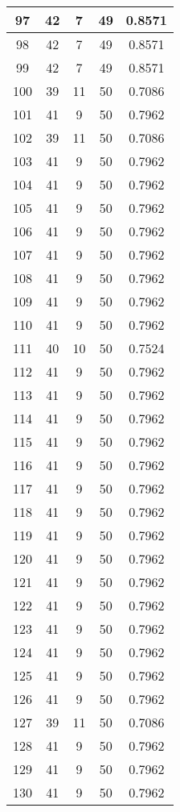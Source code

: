 \documentclass[letterpaper, 12pt]{article}
\begin{document}
\begin{longtable}{|c|c|c|c|c|}
\hline
97 & 42 & 7 & 49 & 0.8571 \\
\hline
98 & 42 & 7 & 49 & 0.8571 \\
\hline
99 & 42 & 7 & 49 & 0.8571 \\
\hline
100 & 39 & 11 & 50 & 0.7086 \\
\hline
101 & 41 & 9 & 50 & 0.7962 \\
\hline
102 & 39 & 11 & 50 & 0.7086 \\
\hline
103 & 41 & 9 & 50 & 0.7962 \\
\hline
104 & 41 & 9 & 50 & 0.7962 \\
\hline
105 & 41 & 9 & 50 & 0.7962 \\
\hline
106 & 41 & 9 & 50 & 0.7962 \\
\hline
107 & 41 & 9 & 50 & 0.7962 \\
\hline
108 & 41 & 9 & 50 & 0.7962 \\
\hline
109 & 41 & 9 & 50 & 0.7962 \\
\hline
110 & 41 & 9 & 50 & 0.7962 \\
\hline
111 & 40 & 10 & 50 & 0.7524 \\
\hline
112 & 41 & 9 & 50 & 0.7962 \\
\hline
113 & 41 & 9 & 50 & 0.7962 \\
\hline
114 & 41 & 9 & 50 & 0.7962 \\
\hline
115 & 41 & 9 & 50 & 0.7962 \\
\hline
116 & 41 & 9 & 50 & 0.7962 \\
\hline
117 & 41 & 9 & 50 & 0.7962 \\
\hline
118 & 41 & 9 & 50 & 0.7962 \\
\hline
119 & 41 & 9 & 50 & 0.7962 \\
\hline
120 & 41 & 9 & 50 & 0.7962 \\
\hline
121 & 41 & 9 & 50 & 0.7962 \\
\hline
122 & 41 & 9 & 50 & 0.7962 \\
\hline
123 & 41 & 9 & 50 & 0.7962 \\
\hline
124 & 41 & 9 & 50 & 0.7962 \\
\hline
125 & 41 & 9 & 50 & 0.7962 \\
\hline
126 & 41 & 9 & 50 & 0.7962 \\
\hline
127 & 39 & 11 & 50 & 0.7086 \\
\hline
128 & 41 & 9 & 50 & 0.7962 \\
\hline
129 & 41 & 9 & 50 & 0.7962 \\
\hline
130 & 41 & 9 & 50 & 0.7962 \\

\end{longtable}
\end{document}
